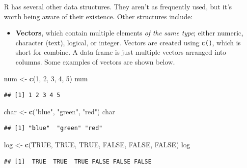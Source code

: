 \documentclass[
]{book}
\newenvironment{Shaded}{\begin{snugshade}}{\end{snugshade}}
\newcommand{\ConstantTok}[1]{\textcolor[rgb]{0.56,0.35,0.01}{#1}}
\newcommand{\DecValTok}[1]{\textcolor[rgb]{0.00,0.00,0.81}{#1}}
\newcommand{\FunctionTok}[1]{\textcolor[rgb]{0.13,0.29,0.53}{\textbf{#1}}}
\newcommand{\NormalTok}[1]{#1}
\newcommand{\OtherTok}[1]{\textcolor[rgb]{0.56,0.35,0.01}{#1}}
\newcommand{\StringTok}[1]{\textcolor[rgb]{0.31,0.60,0.02}{#1}}
\providecommand{\tightlist}{%
  \setlength{\itemsep}{0pt}\setlength{\parskip}{0pt}}
\begin{document}
R has several other data structures. They aren't as frequently used, but it's worth being aware of their existence. Other structures include:

\begin{itemize}
\tightlist
\item
  \textbf{Vectors}, which contain multiple elements \emph{of the same type}; either numeric, character (text), logical, or integer. Vectors are created using \texttt{c()}, which is short for combine. A data frame is just multiple vectors arranged into columns. Some examples of vectors are shown below.
\end{itemize}

\begin{Shaded}
\begin{Highlighting}[]
\NormalTok{num }\OtherTok{\textless{}{-}} \FunctionTok{c}\NormalTok{(}\DecValTok{1}\NormalTok{, }\DecValTok{2}\NormalTok{, }\DecValTok{3}\NormalTok{, }\DecValTok{4}\NormalTok{, }\DecValTok{5}\NormalTok{)}
\NormalTok{num}
\end{Highlighting}
\end{Shaded}

\begin{verbatim}
## [1] 1 2 3 4 5
\end{verbatim}

\begin{Shaded}
\begin{Highlighting}[]
\NormalTok{char }\OtherTok{\textless{}{-}} \FunctionTok{c}\NormalTok{(}\StringTok{"blue"}\NormalTok{, }\StringTok{"green"}\NormalTok{, }\StringTok{"red"}\NormalTok{)}
\NormalTok{char}
\end{Highlighting}
\end{Shaded}

\begin{verbatim}
## [1] "blue"  "green" "red"
\end{verbatim}

\begin{Shaded}
\begin{Highlighting}[]
\NormalTok{log }\OtherTok{\textless{}{-}} \FunctionTok{c}\NormalTok{(}\ConstantTok{TRUE}\NormalTok{, }\ConstantTok{TRUE}\NormalTok{, }\ConstantTok{TRUE}\NormalTok{, }\ConstantTok{FALSE}\NormalTok{, }\ConstantTok{FALSE}\NormalTok{, }\ConstantTok{FALSE}\NormalTok{)}
\NormalTok{log}
\end{Highlighting}
\end{Shaded}

\begin{verbatim}
## [1]  TRUE  TRUE  TRUE FALSE FALSE FALSE
\end{verbatim}
\end{document}
